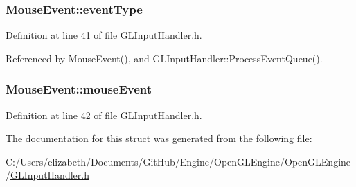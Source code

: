 \subsubsection[{\texorpdfstring{event\+Type}{eventType}}]{ Mouse\+Event\+::event\+Type}\hypertarget{struct_mouse_event_ae6bdad847363f462a57f8be893fd620c}{}\label{struct_mouse_event_ae6bdad847363f462a57f8be893fd620c}


Definition at line 41 of file G\+L\+Input\+Handler.\+h.



Referenced by Mouse\+Event(), and G\+L\+Input\+Handler\+::\+Process\+Event\+Queue().

\subsubsection[{\texorpdfstring{mouse\+Event}{mouseEvent}}]{ Mouse\+Event\+::mouse\+Event}\hypertarget{struct_mouse_event_a75d3e0b8d1c30db9650221cf0769704d}{}\label{struct_mouse_event_a75d3e0b8d1c30db9650221cf0769704d}


Definition at line 42 of file G\+L\+Input\+Handler.\+h.



The documentation for this struct was generated from the following file\+:\begin{DoxyCompactItemize}
\item 
C\+:/\+Users/elizabeth/\+Documents/\+Git\+Hub/\+Engine/\+Open\+G\+L\+Engine/\+Open\+G\+L\+Engine/\hyperlink{_g_l_input_handler_8h}{G\+L\+Input\+Handler.\+h}\end{DoxyCompactItemize}
